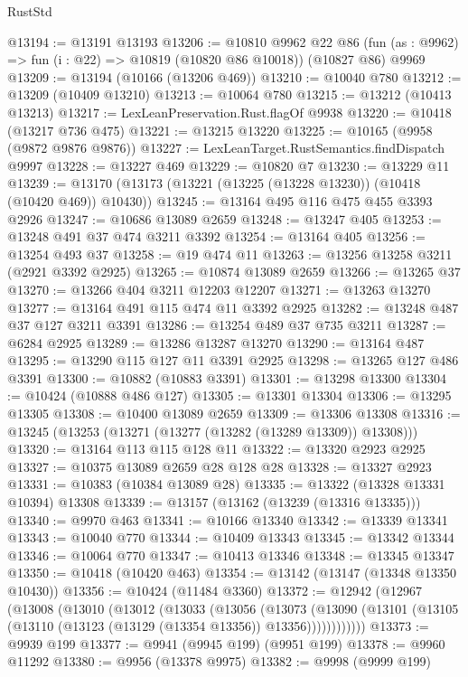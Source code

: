 \begin{lexlean}{RustStd}
\begin{coremodule}
@13194 := @13191 @13193
@13206 := @10810
    @9962
    @22
    @86
    (fun (as : @9962) => fun (i : @22) => @10819 (@10820 @86 @10018))
    (@10827 @86)
    @9969
@13209 := @13194 (@10166 (@13206 @469))
@13210 := @10040 @780
@13212 := @13209 (@10409 @13210)
@13213 := @10064 @780
@13215 := @13212 (@10413 @13213)
@13217 := LexLeanPreservation.Rust.flagOf @9938
@13220 := @10418 (@13217 @736 @475)
@13221 := @13215 @13220
@13225 := @10165 (@9958 (@9872 @9876 @9876))
@13227 := LexLeanTarget.RustSemantics.findDispatch @9997
@13228 := @13227 @469
@13229 := @10820 @7
@13230 := @13229 @11
@13239 := @13170 (@13173 (@13221 (@13225 (@13228 @13230)) (@10418 (@10420 @469)) @10430))
@13245 := @13164 @495 @116 @475 @455 @3393 @2926
@13247 := @10686 @13089 @2659
@13248 := @13247 @405
@13253 := @13248 @491 @37 @474 @3211 @3392
@13254 := @13164 @405
@13256 := @13254 @493 @37
@13258 := @19 @474 @11
@13263 := @13256 @13258 @3211 (@2921 @3392 @2925)
@13265 := @10874 @13089 @2659
@13266 := @13265 @37
@13270 := @13266 @404 @3211 @12203 @12207
@13271 := @13263 @13270
@13277 := @13164 @491 @115 @474 @11 @3392 @2925
@13282 := @13248 @487 @37 @127 @3211 @3391
@13286 := @13254 @489 @37 @735 @3211
@13287 := @6284 @2925
@13289 := @13286 @13287 @13270
@13290 := @13164 @487
@13295 := @13290 @115 @127 @11 @3391 @2925
@13298 := @13265 @127 @486 @3391
@13300 := @10882 (@10883 @3391)
@13301 := @13298 @13300
@13304 := @10424 (@10888 @486 @127)
@13305 := @13301 @13304
@13306 := @13295 @13305
@13308 := @10400 @13089 @2659
@13309 := @13306 @13308
@13316 := @13245 (@13253 (@13271 (@13277 (@13282 (@13289 @13309)) @13308)))
@13320 := @13164 @113 @115 @128 @11
@13322 := @13320 @2923 @2925
@13327 := @10375 @13089 @2659 @28 @128 @28
@13328 := @13327 @2923
@13331 := @10383 (@10384 @13089 @28)
@13335 := @13322 (@13328 @13331 @10394) @13308
@13339 := @13157 (@13162 (@13239 (@13316 @13335)))
@13340 := @9970 @463
@13341 := @10166 @13340
@13342 := @13339 @13341
@13343 := @10040 @770
@13344 := @10409 @13343
@13345 := @13342 @13344
@13346 := @10064 @770
@13347 := @10413 @13346
@13348 := @13345 @13347
@13350 := @10418 (@10420 @463)
@13354 := @13142 (@13147 (@13348 @13350 @10430))
@13356 := @10424 (@11484 @3360)
@13372 := @12942
    (@12967
      (@13008
        (@13010
          (@13012
            (@13033
              (@13056
                (@13073
                  (@13090
                    (@13101 (@13105 (@13110 (@13123 (@13129 (@13354 @13356)) @13356))))))))))))
@13373 := @9939 @199
@13377 := @9941 (@9945 @199) (@9951 @199)
@13378 := @9960 @11292
@13380 := @9956 (@13378 @9975)
@13382 := @9998 (@9999 @199)

\end{coremodule}
\end{lexlean}
